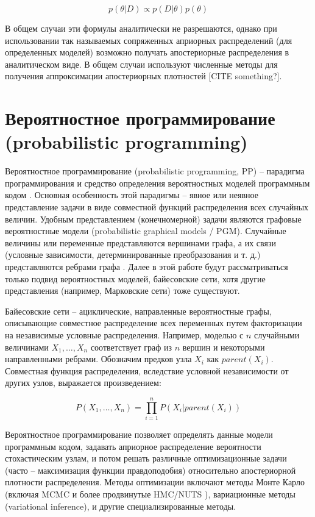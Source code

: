 \documentclass[a4paper,14pt]{extreport}
\begin{document}
\[ p(\theta|D) \propto p(D|\theta) p(\theta) \]

В общем случаи эти формулы аналитически не разрешаются, однако при использовании так называемых сопряженных априорных распределений (для определенных моделей) возможно получать апостериорные распределения в аналитическом виде. В общем случаи используют численные методы для получения аппроксимации апостериорных плотностей [CITE something?].


\section{Вероятностное программирование (probabilistic programming)}

Вероятностное программирование (probabilistic programming, PP) -- парадигма программирования и средство определения вероятностных моделей программным кодом \cite{intro_to_pp}. Основная особенность этой парадигмы – явное или неявное представление задачи в виде совместной функций распределения всех случайных величин. Удобным представлением (конечномерной) задачи являются графовые вероятностные модели (probabilistic graphical models / PGM). Случайные величины или переменные представляются вершинами графа, а их связи (условные зависимости, детерминированные преобразования и т. д.) представляются ребрами графа \cite{intro_to_pp}. Далее в этой работе будут рассматриваться только подвид вероятностных моделей, байесовские сети, хотя другие представления (например, Марковские сети) тоже существуют.

Байесовские сети -- ациклические, направленные вероятностные графы, описывающие совместное распределение всех переменных путем факторизации на независимые условные распределения. Например, моделью с $n$ случайными величинами $X_1, \dots, X_n$ соответствует граф из $n$ вершин и некоторыми направленными ребрами. Обозначим предков узла $X_i$ как $\mathit{parent}(X_i)$. Совместная функция распределения, вследствие условной независимости от других узлов, выражается произведением:

\[ P(X_1, \dots, X_n) = \prod_{i=1}^{n}{P(X_i | \mathit{parent}(X_i))} \]

Вероятностное программирование позволяет определять данные модели программным кодом, задавать априорное распределение вероятности стохастическим узлам, и потом решать различные оптимизационные задачи (часто -- максимизация функции правдоподобия) относительно апостериорной плотности распределения. Методы оптимизации включают методы Монте Карло (включая MCMC и более продвинутые HMC/NUTS \cite{nuts_hoffman_gelman}), вариационные методы (variational inference), и другие специализированные методы.
\end{document}
